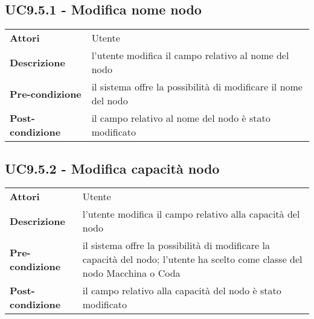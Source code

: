 \subsection{UC9.5.1 - Modifica nome nodo}
\label{sssec:UC9.5.1}
\def\arraystretch{1.5}
\begin{tabularx}{\textwidth}{l|p{}}
\rowcolor{I} \multicolumn{2}{c}{\color{white}\textbf{UC9.5.1 - Modifica nome nodo}} \\
\toprule
\endhead
\textbf{Attori} & Utente\\
\textbf{Descrizione} & l'utente modifica il campo relativo al nome del nodo\\
\textbf{Pre-condizione} & il sistema offre la possibilità di modificare il nome del nodo\\
\textbf{Post-condizione} & il campo relativo al nome del nodo è stato modificato\\
\bottomrule
\end{tabularx}
\subsection{UC9.5.2 - Modifica capacità nodo}
\label{sssec:UC9.5.2}
\def\arraystretch{1.5}
\begin{tabularx}{\textwidth}{l|p{}}
\rowcolor{I} \multicolumn{2}{c}{\color{white}\textbf{UC9.5.2 - Modifica capacità nodo}} \\
\toprule
\endhead
\textbf{Attori} & Utente\\
\textbf{Descrizione} & l'utente modifica il campo relativo alla capacità del nodo\\
\textbf{Pre-condizione} & il sistema offre la possibilità di modificare la capacità del nodo; l'utente ha scelto come classe del nodo Macchina o Coda\\
\textbf{Post-condizione} & il campo relativo alla capacità del nodo è stato modificato\\
\bottomrule
\end{tabularx}
